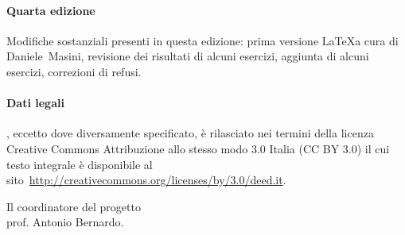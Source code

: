 \paragraph{Quarta edizione} Modifiche sostanziali presenti in questa edizione: prima versione \LaTeX a cura di Daniele~Masini, revisione dei risultati di alcuni esercizi, aggiunta di alcuni esercizi, correzioni di refusi.

\paragraph{Dati legali} \serie{}, eccetto dove diversamente specificato, è rilasciato nei termini della licenza Creative Commons Attribuzione allo stesso modo 3.0 Italia (CC BY 3.0) il cui testo integrale è disponibile al sito~\url{http://creativecommons.org/licenses/by/3.0/deed.it}.

\begin{flushright}
Il coordinatore del progetto\\
prof. Antonio Bernardo.
\end{flushright}

\cleardoublepage

